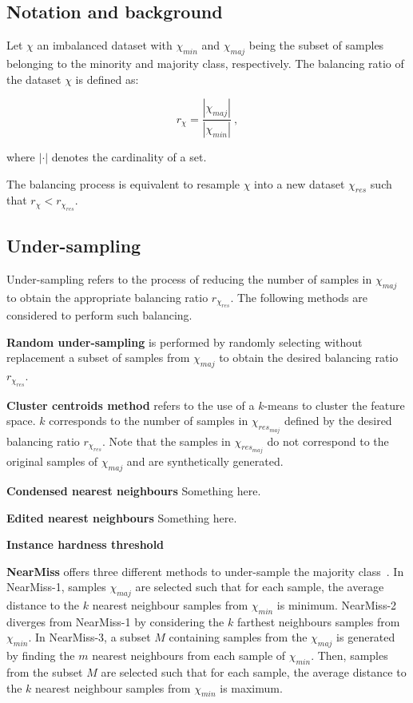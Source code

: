 \documentclass[twoside,11pt]{article}
\begin{document}
\subsection{Notation and background}

Let $\chi$ an imbalanced dataset with $\chi_{min}$ and $\chi_{maj}$ being the subset of samples belonging to the minority and majority class, respectively.
The balancing ratio of the dataset $\chi$ is defined as:

\begin{equation}
r_{\chi} = \frac{|\chi_{maj}|}{|\chi_{min}|} \ ,
\end{equation}

\noindent where $|\cdot|$ denotes the cardinality of a set.

The balancing process is equivalent to resample $\chi$ into a new dataset $\chi_{res}$ such that $r_{\chi} < r_{\chi_{res}}$.

\subsection{Under-sampling}

Under-sampling refers to the process of reducing the number of samples in $\chi_{maj}$ to obtain the appropriate balancing ratio $r_{\chi_{res}}$.
The following methods are considered to perform such balancing.

\textbf{Random under-sampling} is performed by randomly selecting without replacement a subset of samples from $\chi_{maj}$ to obtain the desired balancing ratio $r_{\chi_{res}}$.

\textbf{Cluster centroids method} refers to the use of a $k$-means to cluster the feature space.
$k$ corresponds to the number of samples in $\chi_{res_{maj}}$ defined by the desired balancing ratio $r_{\chi_{res}}$.
Note that the samples in $\chi_{res_{maj}}$ do not correspond to the original samples of $\chi_{maj}$ and are synthetically generated.

\textbf{Condensed nearest neighbours} Something here.

\textbf{Edited nearest neighbours} Something here.

\textbf{Instance hardness threshold}

\textbf{NearMiss} offers three different methods to under-sample the majority class~\citep{mani2003knn}.
In NearMiss-1, samples $\chi_{maj}$ are selected such that for each sample, the average distance to the $k$ nearest neighbour samples from $\chi_{min}$ is minimum.
NearMiss-2 diverges from NearMiss-1 by considering the $k$ farthest neighbours samples from $\chi_{min}$.
In NearMiss-3, a subset $M$ containing samples from the $\chi_{maj}$ is generated by finding the $m$ nearest neighbours from each sample of $\chi_{min}$.
Then, samples from the subset $M$ are selected such that for each sample, the average distance to the $k$ nearest neighbour samples from $\chi_{min}$ is maximum.
\end{document}
